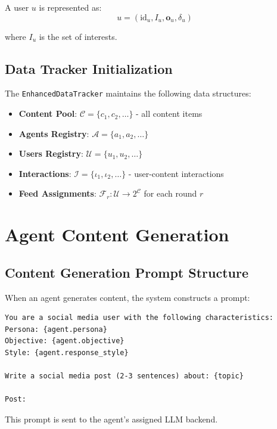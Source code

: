 \documentclass[11pt]{article}
\begin{document}
A user $u$ is represented as:
\begin{equation}
u = (\text{id}_u, I_u, \mathbf{o}_u, \delta_u)
\end{equation}

where $I_u$ is the set of interests.

\subsection{Data Tracker Initialization}

The \texttt{EnhancedDataTracker} maintains the following data structures:

\begin{itemize}
    \item \textbf{Content Pool}: $\mathcal{C} = \{c_1, c_2, \ldots\}$ - all content items
    \item \textbf{Agents Registry}: $\mathcal{A} = \{a_1, a_2, \ldots\}$
    \item \textbf{Users Registry}: $\mathcal{U} = \{u_1, u_2, \ldots\}$
    \item \textbf{Interactions}: $\mathcal{I} = \{\iota_1, \iota_2, \ldots\}$ - user-content interactions
    \item \textbf{Feed Assignments}: $\mathcal{F}_r: \mathcal{U} \rightarrow 2^{\mathcal{C}}$ for each round $r$
\end{itemize}

\section{Agent Content Generation}

\subsection{Content Generation Prompt Structure}

When an agent generates content, the system constructs a prompt:

\begin{lstlisting}[basicstyle=\small\ttfamily, breaklines=true]
You are a social media user with the following characteristics:
Persona: {agent.persona}
Objective: {agent.objective}
Style: {agent.response_style}

Write a social media post (2-3 sentences) about: {topic}

Post:
\end{lstlisting}

This prompt is sent to the agent's assigned LLM backend.
\end{document}
